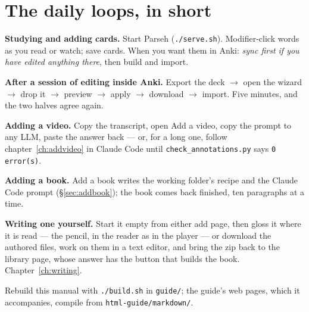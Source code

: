 \documentclass[11pt,oneside]{report}
\newcommand{\file}[1]{\texttt{#1}}
\newcommand{\menu}[1]{\textsf{#1}}
\begin{document}
\section{The daily loops, in short}

\begin{goodbox}
\textbf{Studying and adding cards.} Start Parseh (\file{./serve.sh}).
Modifier-click words as you read or watch; save cards. When you want them in
Anki: \emph{sync first if you have edited anything there}, then build and
import.

\medskip
\textbf{After a session of editing inside Anki.} Export the deck $\rightarrow$
open the wizard $\rightarrow$ drop it $\rightarrow$ preview $\rightarrow$
apply $\rightarrow$ download $\rightarrow$ import. Five minutes, and the two
halves agree again.

\medskip
\textbf{Adding a video.} Copy the transcript, open \menu{Add a video},
copy the prompt to any LLM, paste the answer back --- or, for a long one,
follow chapter~\ref{ch:addvideo} in Claude Code until
\file{check\_annotations.py} says \texttt{0 error(s)}.

\medskip
\textbf{Adding a book.} \menu{Add a book} writes the working folder's
recipe and the Claude Code prompt (\S\ref{sec:addbook}); the book comes
back finished, ten paragraphs at a time.

\medskip
\textbf{Writing one yourself.} Start it empty from either add page, then
gloss it where it is read --- the pencil, in the reader as in the player ---
or \menu{download} the authored files, work on them in a text editor, and
bring the zip back to the library page, whose answer has the button that
builds the book. Chapter~\ref{ch:writing}.
\end{goodbox}

\vfill
\begin{center}\color{dim}\sffamily\small
Rebuild this manual with \file{./build.sh} in \file{guide/}; the guide's web
pages, which it accompanies, compile from \file{html-guide/markdown/}.
\end{center}
\end{document}
